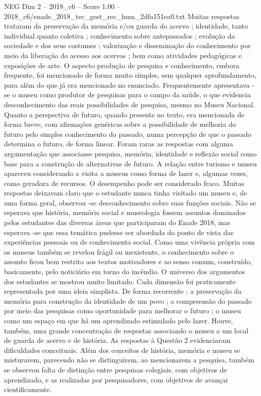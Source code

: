 \begin{textsample}{NEG Dim 2 – 2018\_c6 – Score 1.00 – 2018\_c6/enade\_2018\_tec\_gest\_rec\_hum\_2dfa151ea0.txt}
Muitas respostas trataram da preservação da memória e/ou guarda do acervo ; identidade, tanto individual quanto coletiva ; conhecimento sobre antepassados ; evolução da sociedade e dos seus costumes ; valorização e disseminação do conhecimento por meio da liberação do acesso aos acervos ; bem como atividades pedagógicas e exposições de arte.
O aspecto produção de pesquisa e conhecimento, embora frequente, foi mencionado de forma muito simples, sem qualquer aprofundamento, para além do que já era mencionado no enunciado.
Frequentemente apresentava -se o museu como produtor de pesquisas para o campo da saúde, o que evidencia desconhecimento das reais possibilidades de pesquisa, mesmo no Museu Nacional.
Quanto a perspectiva de futuro, quando presente no texto, era mencionada de forma breve, com afirmações genéricas sobre a possibilidade de melhoria do futuro pelo simples conhecimento do passado, numa percepção de que o passado determina o futuro, de forma linear.
Foram raras as respostas com alguma argumentação que associasse pesquisa, memória, identidade e reflexão social como base para a construção de alternativas de futuro.
A relação entre turismo e museu apareceu considerando a visita a museus como forma de lazer e, algumas vezes, como geradora de recursos.
O desempenho pode ser considerado fraco.
Muitas respostas deixavam claro que o estudante nunca tinha visitado um museu e, de uma forma geral, observou -se desconhecimento sobre suas funções sociais.
Não se esperava que história, memória social e museologia fossem assuntos dominados pelos estudantes das diversas áreas que participaram do Enade 2018, mas esperava -se que essa temática pudesse ser abordada do ponto de vista das experiências pessoais ou de conhecimento social.
Como uma vivência própria com os museus também se revelou frágil ou inexistente, o conhecimento sobre o assunto ficou bem restrito aos textos motivadores e ao senso comum, construído, basicamente, pelo noticiário em torno do incêndio.
O universo dos argumentos dos estudantes se mostrou muito limitado.
Cada dimensão foi praticamente representada por uma ideia simplista.
De forma recorrente : a preservação da memória para construção da identidade de um povo ; a compreensão do passado por meio das pesquisas como oportunidade para melhorar o futuro ; o museu como um espaço em que há um aprendizado estimulado pelo lazer.
Houve, também, uma grande concentração de respostas associando o museu a um local de guarda de acervo e de história.
As respostas à Questão 2 evidenciaram dificuldades conceituais.
Além dos conceitos de história, memória e museu se misturarem, parecendo não se distinguirem, ao mencionarem a pesquisa, também se observou falta de distinção entre pesquisas colegiais, com objetivos de aprendizado, e as realizadas por pesquisadores, com objetivos de avançar cientificamente.

\end{textsample}
